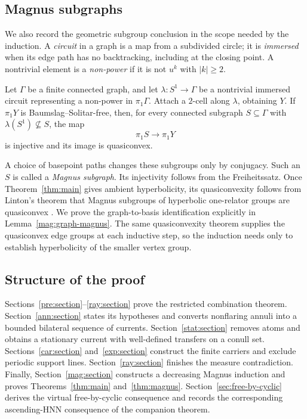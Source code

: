 \subsection{Magnus subgraphs}

We also record the geometric subgroup conclusion in the scope needed
by the induction. A \emph{circuit} in a graph is a map from a subdivided
circle; it is \emph{immersed} when its edge path has no backtracking,
including at the closing point. A nontrivial element is a
\emph{non-power} if it is not $u^k$ with $|k|\geq2$.

\begin{theorem}\label{thm:magnus}
Let $\Gamma$ be a finite connected graph, and let
$\lambda:S^1\to\Gamma$ be a nontrivial immersed circuit representing a
non-power in $\pi_1\Gamma$. Attach a $2$-cell along $\lambda$, obtaining
$Y$. If $\pi_1Y$ is Baumslag--Solitar-free, then, for every connected
subgraph $S\subseteq\Gamma$ with $\lambda(S^1)\nsubseteq S$, the map
\[
 \pi_1S\longrightarrow\pi_1Y
\]
is injective and its image is quasiconvex.
\end{theorem}

A choice of basepoint paths changes these subgroups only by conjugacy.
Such an $S$ is called a \emph{Magnus subgraph}. Its injectivity follows
from the Freiheitssatz. Once Theorem~\ref{thm:main} gives ambient
hyperbolicity, its quasiconvexity follows from Linton's theorem that
Magnus subgroups of hyperbolic one-relator groups are quasiconvex
\cite[Theorem~4.7]{LintonHyperbolic2026}.
We prove the graph-to-basis identification explicitly in
Lemma~\ref{mag:graph-magnus}. The same quasiconvexity theorem supplies the
quasiconvex edge groups at each inductive step, so the induction needs
only to establish hyperbolicity of the smaller vertex group.

\subsection{Structure of the proof}

Sections~\ref{pre:section}--\ref{ray:section} prove the restricted
combination theorem. Section~\ref{ann:section} states its hypotheses and
converts nonflaring annuli into a bounded bilateral sequence of
currents. Section~\ref{stat:section} removes atoms and obtains a
stationary current with well-defined transfers on a conull set.
Sections~\ref{car:section} and~\ref{exp:section} construct the finite
carriers and exclude periodic support lines. Section~\ref{ray:section}
finishes the measure contradiction. Finally, Section~\ref{mag:section}
constructs a decreasing Magnus induction and proves
Theorems~\ref{thm:main} and~\ref{thm:magnus}.
Section~\ref{sec:free-by-cyclic} derives the virtual free-by-cyclic
consequence and records the corresponding ascending-HNN consequence
of the companion theorem.
